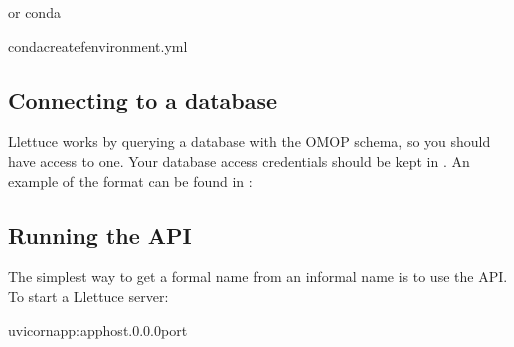 \documentclass[letterpaper,10pt,english]{sphinxmanual}
\begin{document}
\sphinxAtStartPar
or conda

\begin{sphinxVerbatim}[commandchars=\\\{\}]
condacreate\PYGZhy{}fenvironment.yml
\end{sphinxVerbatim}


\subsection{Connecting to a database}
\label{\detokenize{usage:connecting-to-a-database}}
\sphinxAtStartPar
Llettuce works by querying a database with the OMOP schema, so you should have access to one. Your database access credentials should be kept in . An example of the format can be found in :

\begin{sphinxVerbatim}[commandchars=\\\{\}]
\end{sphinxVerbatim}


\subsection{Running the API}
\label{\detokenize{usage:running-the-api}}
\sphinxAtStartPar
The simplest way to get a formal name from an informal name is to use the API. To start a Llettuce server:

\begin{sphinxVerbatim}[commandchars=\\\{\}]
uvicornapp:app\PYGZhy{}\PYGZhy{}host.0.0.0\PYGZhy{}\PYGZhy{}port
\end{sphinxVerbatim}
\end{document}
